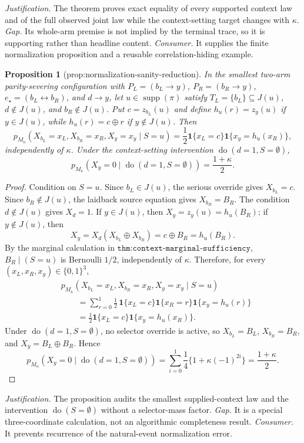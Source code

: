 \documentclass{article}
\newtheorem{proposition}{Proposition}
\begin{document}
\par\smallskip\noindent \textit{Justification.} The theorem proves exact equality of every supported context law and of the full observed joint law while the context-setting target changes with \(\kappa\). \textit{Gap.} Its whole-arm premise is not implied by the terminal trace, so it is supporting rather than headline content. \textit{Consumer.} It supplies the finite normalization proposition and a reusable correlation-hiding example.

\begin{proposition}[prop:normalization-sanity-reduction]\label{prop:normalization-sanity-reduction}
In the smallest two-arm parity-severing configuration with \(P_L=(b_L\to y)\), \(P_R=(b_R\to y)\), \(e_\star=(b_L\leftrightarrow b_R)\), and \(d\to y\), let \(u\in\operatorname{supp}(\pi)\) satisfy \(T_L=\{b_L\}\subseteq J(u)\), \(d\notin J(u)\), and \(b_R\notin J(u)\). Put \(c=z_{b_L}(u)\) and define \(h_u(r)=z_y(u)\) if \(y\in J(u)\), while \(h_u(r)=c\oplus r\) if \(y\notin J(u)\). Then
\[p_{M_\kappa}(X_{b_L}=x_L,X_{b_R}=x_R,X_y=x_y\mid S=u)=\frac12\mathbf 1\{x_L=c\}\mathbf 1\{x_y=h_u(x_R)\},\]
independently of \(\kappa\). Under the context-setting intervention \(\operatorname{do}(d=1,S=\emptyset)\),
\[p_{M_\kappa}(X_y=0\mid\operatorname{do}(d=1,S=\emptyset))=\frac{1+\kappa}{2}.\]
\end{proposition}
\begin{proof}
Condition on \(S=u\). Since \(b_L\in J(u)\), the serious override gives \(X_{b_L}=c\). Since \(b_R\notin J(u)\), the laidback source equation gives \(X_{b_R}=B_R\). The condition \(d\notin J(u)\) gives \(X_d=1\). If \(y\in J(u)\), then \(X_y=z_y(u)=h_u(B_R)\); if \(y\notin J(u)\), then
\[
X_y=X_d(X_{b_L}\oplus X_{b_R})=c\oplus B_R=h_u(B_R).
\]
By the marginal calculation in \(\texttt{thm:context-marginal-sufficiency}\), \(B_R\mid(S=u)\) is Bernoulli \(1/2\), independently of \(\kappa\). Therefore, for every \((x_L,x_R,x_y)\in\{0,1\}^3\),
\[
\begin{aligned}
& p_{M_\kappa}(X_{b_L}=x_L,X_{b_R}=x_R,X_y=x_y\mid S=u)\\
&\qquad=\sum_{r=0}^1\frac12\,\mathbf 1\{x_L=c\}\mathbf 1\{x_R=r\}\mathbf 1\{x_y=h_u(r)\}\\
&\qquad=\frac12\mathbf 1\{x_L=c\}\mathbf 1\{x_y=h_u(x_R)\}.
\end{aligned}
\]
Under \(\operatorname{do}(d=1,S=\emptyset)\), no selector override is active, so \(X_{b_L}=B_L\), \(X_{b_R}=B_R\), and \(X_y=B_L\oplus B_R\). Hence
\[
p_{M_\kappa}(X_y=0\mid\operatorname{do}(d=1,S=\emptyset))=\sum_{i=0}^1\frac14\{1+\kappa(-1)^{2i}\}=\frac{1+\kappa}{2}.
\]
\end{proof}
\par\smallskip\noindent \textit{Justification.} The proposition audits the smallest supplied-context law and the intervention \(\operatorname{do}(S=\emptyset)\) without a selector-mass factor. \textit{Gap.} It is a special three-coordinate calculation, not an algorithmic completeness result. \textit{Consumer.} It prevents recurrence of the natural-event normalization error.
\end{document}
